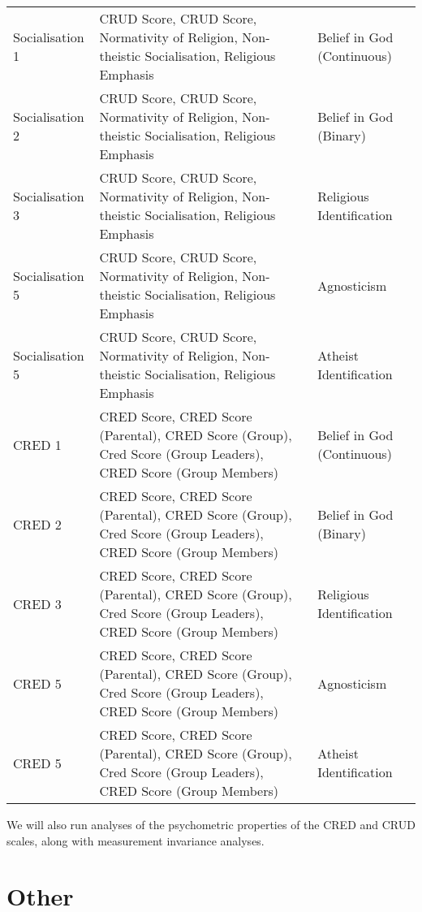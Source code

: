 \documentclass[]{article}
\begin{document}
\begin{longtable}[]{@{}
  >{\raggedright\arraybackslash}p{}
  >{\raggedright\arraybackslash}p{}
  >{\raggedright\arraybackslash}p{}@{}}
\toprule\noalign{}
\endhead
\bottomrule\noalign{}
\endlastfoot
Socialisation 1 & CRUD Score, CRUD Score, Normativity of Religion,
Non-theistic Socialisation, Religious Emphasis & Belief in God
(Continuous) \\
Socialisation 2 & CRUD Score, CRUD Score, Normativity of Religion,
Non-theistic Socialisation, Religious Emphasis & Belief in God
(Binary) \\
Socialisation 3 & CRUD Score, CRUD Score, Normativity of Religion,
Non-theistic Socialisation, Religious Emphasis & Religious
Identification \\
Socialisation 5 & CRUD Score, CRUD Score, Normativity of Religion,
Non-theistic Socialisation, Religious Emphasis & Agnosticism \\
Socialisation 5 & CRUD Score, CRUD Score, Normativity of Religion,
Non-theistic Socialisation, Religious Emphasis & Atheist
Identification \\
CRED 1 & CRED Score, CRED Score (Parental), CRED Score (Group), Cred
Score (Group Leaders), CRED Score (Group Members) & Belief in God
(Continuous) \\
CRED 2 & CRED Score, CRED Score (Parental), CRED Score (Group), Cred
Score (Group Leaders), CRED Score (Group Members) & Belief in God
(Binary) \\
CRED 3 & CRED Score, CRED Score (Parental), CRED Score (Group), Cred
Score (Group Leaders), CRED Score (Group Members) & Religious
Identification \\
CRED 5 & CRED Score, CRED Score (Parental), CRED Score (Group), Cred
Score (Group Leaders), CRED Score (Group Members) & Agnosticism \\
CRED 5 & CRED Score, CRED Score (Parental), CRED Score (Group), Cred
Score (Group Leaders), CRED Score (Group Members) & Atheist
Identification \\
\end{longtable}

We will also run analyses of the psychometric properties of the CRED and
CRUD scales, along with measurement invariance analyses.

\hypertarget{other}{%
\section{Other}\label{other}}
\end{document}
